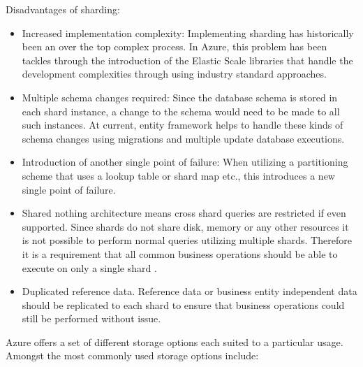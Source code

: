  
Disadvantages of sharding:
\begin{itemize}
\item Increased implementation complexity: Implementing sharding has historically been an over the top complex process. In Azure, this problem has been tackles through the introduction of the Elastic Scale libraries that handle the development complexities through using industry standard approaches.
\item Multiple schema changes required: Since the database schema is stored in each shard instance, a change to the schema would need to be made to all such instances. At current, entity framework helps to handle these kinds of schema changes using migrations and multiple update database executions.
\item Introduction of another single point of failure: When utilizing a partitioning scheme that uses a lookup table or shard map etc., this introduces a new single point of failure.
\item Shared nothing architecture means cross shard queries are restricted if even supported. Since shards do not share disk, memory or any other resources it is not possible to perform normal queries utilizing multiple shards. Therefore it is a requirement that all common business operations should be able to execute on only a single shard \cite{Wilder2012-so}.
\item Duplicated reference data. Reference data or business entity independent data should be replicated to each shard to ensure that business operations could still be performed without issue.
\end{itemize}
 
Azure offers a set of different storage options each suited to a particular usage. Amongst the most commonly used storage options include:


